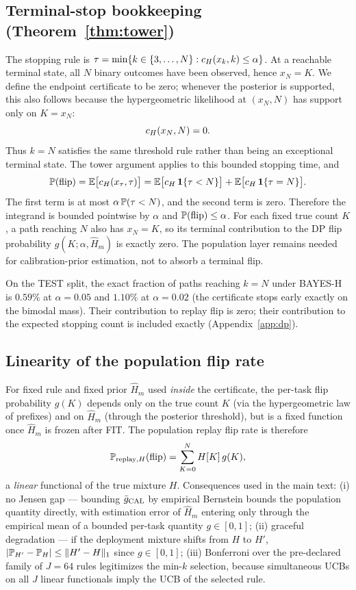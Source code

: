\subsection{Terminal-stop bookkeeping (Theorem~\ref{thm:tower})}

The stopping rule is
$\tau=\min\{k\in\{3,\ldots,N\}:\cert(x_k,k)\le\alpha\}$.  At a reachable
terminal state, all $N$ binary outcomes have been observed, hence $x_N=K$.
We define the endpoint certificate to be zero; whenever the posterior is
supported, this also follows because the hypergeometric likelihood at
$(x_N,N)$ has support only on $K=x_N$:
\[
\cert(x_N,N)=0.
\]
Thus $k=N$ satisfies the same threshold rule rather than being an exceptional
terminal state. The tower argument applies to this bounded stopping time,
and
\[
\P(\flip)=\E\big[\cert(x_\tau,\tau)\big]
=\E\big[\cert\,\mathbf 1\{\tau<N\}\big]+\E\big[\cert\,\mathbf 1\{\tau=N\}\big].
\]
The first term is at most $\alpha\,\P(\tau<N)$, and the second term is zero.
Therefore the integrand is bounded pointwise by $\alpha$ and
$\P(\flip)\le\alpha$.  For each fixed true count $K$, a path reaching $N$
also has $x_N=K$, so its terminal contribution to the DP flip probability
$g(K;\alpha,\widehat H_m)$ is exactly zero.  The population layer remains
needed for calibration-prior estimation, not to absorb a terminal flip.

\begin{remark}
On the TEST split, the exact fraction of paths reaching $k=N$ under
BAYES-H is $0.59\%$ at $\alpha=0.05$ and $1.10\%$ at $\alpha=0.02$ (the
certificate stops early exactly on the bimodal mass). Their contribution to
replay flip is zero; their contribution to the expected stopping count is
included exactly (Appendix~\ref{app:dp}).
\end{remark}

\subsection{Linearity of the population flip rate}

For fixed rule and fixed prior $\widehat H_m$ used \emph{inside} the
certificate, the per-task flip probability $g(K)$ depends only on the true
count $K$ (via the hypergeometric law of prefixes) and on $\widehat H_m$
(through the posterior threshold), but is a fixed function once $\widehat H_m$
is frozen after FIT. The population replay flip rate is therefore
\[
\P_{\text{replay},H}(\flip)=\sum_{K=0}^{N} H[K]\,g(K),
\]
a \emph{linear} functional of the true mixture $H$. Consequences used in the
main text: (i) no Jensen gap --- bounding $\bar g_{\calD}$ by empirical
Bernstein bounds the population quantity directly, with estimation error of
$\widehat H_m$ entering only through the empirical mean of a bounded per-task
quantity $g\in[0,1]$; (ii) graceful degradation --- if the deployment mixture
shifts from $H$ to $H'$, $|\P_{H'}-\P_H|\le\|H'-H\|_1$ since
$g\in[0,1]$; (iii) Bonferroni over the pre-declared family of $J=64$ rules
legitimizes the min-$k$ selection, because simultaneous UCBs on all $J$
linear functionals imply the UCB of the selected rule.
